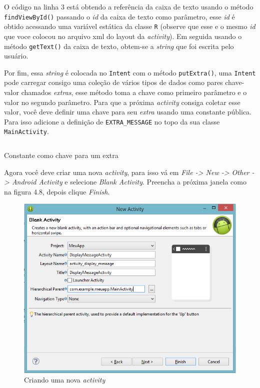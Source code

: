 \documentclass[a4paper,12pt,brazil]{book}
\begin{document}
\begin{singlespace}
O código na linha 3 está obtendo a referência da caixa de texto usando o método \texttt{findViewById()} passando o \textit{id} da caixa de texto como parâmetro, esse \emph{id} é obtido acessando uma variável estática da classe \texttt{R}  (observe que esse e o mesmo \emph{id} que voce colocou no arquivo xml do layout da \emph{activity}).
Em seguida usando o método \texttt{getText()} da caixa de texto, obtem-se a \emph{string} que foi escrita pelo usuário.

Por fim, essa \emph{string} é colocada no \texttt{Intent} com o método \texttt{putExtra()}, uma \texttt{Intent} pode carregar consigo uma coleção de vários tipos de dados como pares chave-valor chamados \textit{extras}, esse método toma a chave como primeiro parâmetro e o valor no segundo parâmetro.
Para que a próxima \emph{activity} consiga coletar esse valor, você deve definir uma chave para seu \textit{extra} usando uma constante pública. Para isso adicione a definição de \texttt{EXTRA\_MESSAGE} no topo da sua classe \texttt{MainActivity}.

\begin{listing}[H]
\inputminted[linenos=true,fontsize=\small,frame=lines, framesep=2mm, tabsize=2,numbersep=5pt]{java}{src/firstapp/7.java}
\caption{Constante como chave para um extra}
\end{listing}

Agora você deve criar uma nova \emph{activity}, para isso vá em \textit{File -> New -> Other -> Android Activity} e selecione \textit{Blank Activity}. Preencha a próxima janela como na figura 4.8, depois clique \textit{Finish}. 

\begin{figure}[H]
  \centering
  \includegraphics[width=1\textwidth]{figuras/5-criando-app.png}
  \caption{Criando uma nova \emph{activity}}
  \label{fig:e}
\end{figure}


\end{singlespace}
\end{document}
